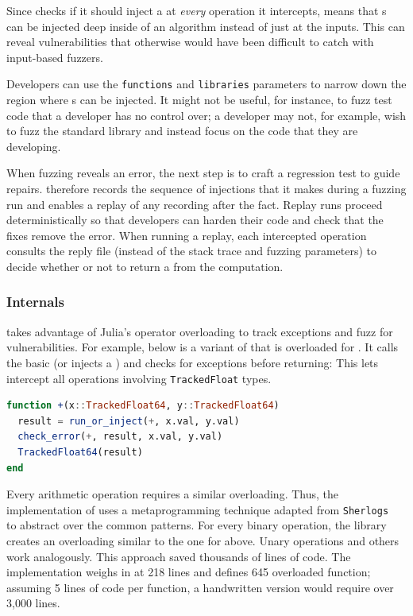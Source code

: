 \documentclass{juliacon}
\begin{document}
Since \TF{} checks if it should inject a \Nan{} at \emph{every} \fp{}
operation it intercepts, means that \Nan{}s can be injected deep
inside of an algorithm instead of just at the inputs.
This can reveal vulnerabilities that otherwise would have been
difficult to catch with input-based fuzzers.

Developers can use the \texttt{functions} and \texttt{libraries}
parameters to narrow down the region where \Nan{}s can be injected.
It might not be useful, for instance, to fuzz test code that a
developer has no control over; a developer may not, for example, wish
to fuzz the standard library and instead focus on the code that they
are developing.

When fuzzing reveals an error, the next step is to craft a regression test to
guide repairs.
\TF{} therefore records the sequence of injections that it makes during a fuzzing
run and enables a replay of any recording after the fact.
Replay runs proceed deterministically so that developers can harden
their code and check that the fixes remove the error.
When running a replay, each intercepted operation consults the reply
file (instead of the stack trace and fuzzing parameters) to decide
whether or not to return a \Nan{} from the computation.


\subsubsection{\TF{} Internals}

\TF{} takes advantage of Julia's operator overloading to track exceptions and
fuzz for vulnerabilities.
For example, below is a variant of \code{+} that is overloaded
for .
It calls the basic \code{+} (or injects a \Nan{}) and checks for exceptions
before returning:
This lets \TF{} intercept all \fp{} operations involving \texttt{TrackedFloat} types.

\begin{lstlisting}[language = Julia]
function +(x::TrackedFloat64, y::TrackedFloat64)
  result = run_or_inject(+, x.val, y.val)
  check_error(+, result, x.val, y.val)
  TrackedFloat64(result)
end
\end{lstlisting}

Every arithmetic operation requires a similar overloading.
Thus, the implementation of \TF{} uses a metaprogramming technique
adapted from \texttt{Sherlogs}~\cite{kMilanklSherlogsJl2021}
to abstract over the common patterns.
For every binary operation, the library creates an overloading similar
to the one for \code{+} above.
Unary operations and others work analogously.
This approach saved thousands of lines of code.
The implementation weighs in at 218 lines and defines 645 overloaded function;
assuming 5 lines of code per function, a handwritten version would require over 3,000 lines.
\end{document}

